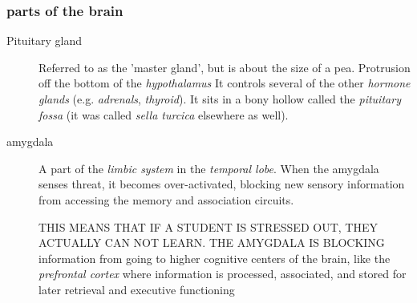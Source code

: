 \documentclass[11pt]{article}
\begin{document}
\subsubsection{parts of the brain}
\label{sec:org88ed066}
\begin{description}
\item[{Pituitary gland}] Referred to as the 'master gland', but is about the
size of a pea. Protrusion off the bottom of the \emph{hypothalamus} It
controls several of the other \emph{hormone glands} (e.g. \emph{adrenals}, \emph{thyroid}).
It sits in a bony hollow called the \emph{pituitary fossa} (it was called
\emph{sella turcica} elsewhere as well).
\item[{amygdala}] A part of the \emph{limbic system} in the \emph{temporal lobe}. When the
amygdala senses threat, it becomes over-activated, blocking new
sensory information from accessing the memory and association
circuits.

THIS MEANS THAT IF A STUDENT IS STRESSED OUT, THEY ACTUALLY CAN NOT
LEARN. THE AMYGDALA IS BLOCKING information from going to higher
cognitive centers of the brain, like the \emph{prefrontal cortex} where
information is processed, associated, and stored for later retrieval
and executive functioning
\end{description}
\end{document}

